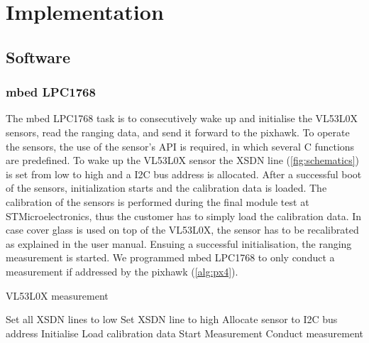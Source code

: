 \chapter{Implementation}
\label{ch:implementation}

\section{Software}
\subsection{mbed LPC1768}
\label{subs:mbed}
The mbed LPC1768 task is to consecutively wake up and initialise the VL53L0X sensors, read the ranging data, and send it forward to the pixhawk. To operate the sensors, the use of the sensor's API is required, in which several C functions are predefined. To wake up the VL53L0X sensor the XSDN line (\cref{fig:schematics}) is set from low to high and a I2C bus address is allocated. After a successful boot of the sensors, initialization starts and the calibration data is loaded. The calibration of the sensors is performed during the final module test at STMicroelectronics, thus the customer has to simply load the calibration data. In case cover glass is used on top of the VL53L0X, the sensor has to be recalibrated as explained in the user manual. Ensuing a successful initialisation, the ranging measurement is started. We programmed mbed LPC1768 to only conduct a measurement if addressed by the pixhawk (\cref{alg:px4}). 

\begin{algorithm}
	\caption{VL53L0X measurement}\label{alg:px4}
	\begin{algorithmic}[1]
		\State Set all XSDN lines to low
		\State Set XSDN line to high
		\State Allocate sensor to I2C bus address
		\EndFor
		\State Initialise 
		\State Load calibration data
		\EndFor
		\State Start Measurement
		\State Conduct measurement
		\EndIf
		\EndFor
		\EndProcedure
	\end{algorithmic}
\end{algorithm}

